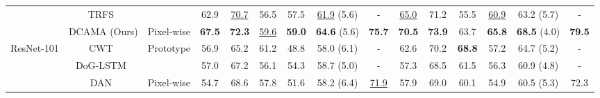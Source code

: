 \documentclass[runningheads,table,xcdraw]{llncs}
\begin{document}
\begin{table*}[t]
{\begin{tabular}{ccccccccccccccc}
\multicolumn{1}{c|}{}                            & \multicolumn{1}{c|}{TRFS~\cite{sun2021boosting}}             & \multicolumn{1}{c|}{}                            & 62.9          & \uline{70.7}  & 56.5          & \multicolumn{1}{c|}{57.5}          & \multicolumn{1}{c|}{\uline{61.9} (5.6)}  & \multicolumn{1}{c|}{-}             & \uline{65.0}  & 71.2          & 55.5          & \multicolumn{1}{c|}{\uline{60.9}}  & \multicolumn{1}{c|}{63.2 (5.7)}          & -             \\ \cline{2-15}
\multicolumn{1}{c|}{}                            & \multicolumn{1}{c|}{DCAMA (Ours)}                            & \multicolumn{1}{c|}{Pixel-wise}                  & \textbf{67.5} & \textbf{72.3} & \uline{59.6}  & \multicolumn{1}{c|}{\textbf{59.0}} & \multicolumn{1}{c|}{\textbf{64.6} (5.6)} & \multicolumn{1}{c|}{\textbf{75.7}} & \textbf{70.5} & \textbf{73.9} & 63.7          & \multicolumn{1}{c|}{\textbf{65.8}} & \multicolumn{1}{c|}{\textbf{68.5} (4.0)} & \textbf{79.5} \\ \hline
\multicolumn{1}{c|}{\multirow{6}{*}{ResNet-101}} & \multicolumn{1}{c|}{CWT~\cite{lu2021simpler}}                & \multicolumn{1}{c|}{\multirow{2}{*}{Prototype}}  & 56.9          & 65.2          & 61.2          & \multicolumn{1}{c|}{48.8}          & \multicolumn{1}{c|}{58.0 (6.1)}          & \multicolumn{1}{c|}{-}             & 62.6          & 70.2          & \textbf{68.8}  & \multicolumn{1}{c|}{57.2}          & \multicolumn{1}{c|}{64.7 (5.2)}          & -             \\
\multicolumn{1}{c|}{}                            & \multicolumn{1}{c|}{DoG-LSTM~\cite{azad2021texture}}                & \multicolumn{1}{c|}{}                            & 57.0          & 67.2          & 56.1          & \multicolumn{1}{c|}{54.3}          & \multicolumn{1}{c|}{58.7 (5.0)}          & \multicolumn{1}{c|}{-}             & 57.3          & 68.5          & 61.5          & \multicolumn{1}{c|}{56.3}          & \multicolumn{1}{c|}{60.9 (4.8)}          & -             \\ \cline{2-15}
\multicolumn{1}{c|}{}                            & \multicolumn{1}{c|}{DAN~\cite{wang2020few}}                         & \multicolumn{1}{c|}{\multirow{4}{*}{Pixel-wise}} & 54.7          & 68.6          & 57.8          & \multicolumn{1}{c|}{51.6}          & \multicolumn{1}{c|}{58.2 (6.4)}          & \multicolumn{1}{c|}{\uline{71.9}}          & 57.9          & 69.0          & 60.1          & \multicolumn{1}{c|}{54.9}          & \multicolumn{1}{c|}{60.5 (5.3)}          & 72.3          \\

\end{tabular}}
\end{table*}
\end{document}
